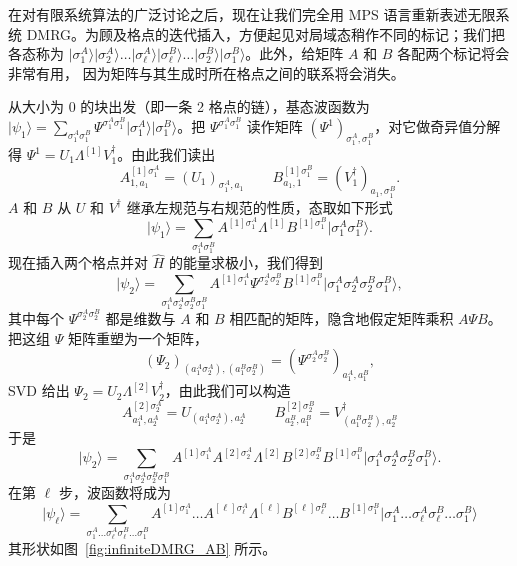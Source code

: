 \documentclass[a4paper,10pt,oneside,onecolumn,1p,times]{elsarticle}
\newcommand{\ket}[1]{\mbox{$| #1  \rangle$}}
\begin{document}
在对有限系统算法的广泛讨论之后，现在让我们完全用 MPS 语言重新表述无限系统 DMRG。为顾及格点的迭代插入，方便起见对局域态稍作不同的标记；我们把各态称为 $\ket{\sigma_1^A} \ket{\sigma_2^A} \ldots \ket{\sigma_\ell^A}\ket{\sigma_\ell^B} \ldots \ket{\sigma_2^B}\ket{\sigma_1^B}$。此外，给矩阵 $A$ 和 $B$ 各配两个标记将会非常有用，
因为矩阵与其生成时所在格点之间的联系将会消失。

从大小为 0 的块出发（即一条 2 格点的链），基态波函数为 $\ket{\psi_1}=\sum_{\sigma_1^A \sigma_1^B} \Psi^{\sigma_1^A \sigma_1^B} \ket{\sigma_1^A} \ket{\sigma_1^B}$。把 $\Psi^{\sigma_1^A\sigma_1^B}$ 读作矩阵 $(\Psi^1)_{\sigma_1^A,\sigma_1^B}$，对它做奇异值分解得  $\Psi^1=U_1 \Lambda^{[1]} V^\dagger_1$。由此我们读出
\begin{equation}
A^{[1]\sigma_1^A}_{1,a_1} = (U_1)_{\sigma_1^A,a_1} \quad\quad B^{[1]\sigma_1^B}_{a_1,1} = (V^\dagger_1)_{a_1,\sigma_1^B} .
\end{equation} 
$A$ 和 $B$ 从 $U$ 和 $V^\dagger$ 继承左规范与右规范的性质，态取如下形式
\begin{equation}
\ket{\psi_1} = \sum_{\sigma_1^A \sigma_1^B} A^{[1]\sigma_1^A} \Lambda^{[1]} B^{[1]\sigma_1^B} \ket{\sigma_1^A \sigma_1^B} .
\end{equation}
现在插入两个格点并对 $\hat{H}$ 的能量求极小，我们得到
\begin{equation}
\ket{\psi_2} = \sum_{\sigma_1^A \sigma_2^A \sigma_2^B \sigma_1^B} A^{[1]\sigma_1^A} 
\Psi^{\sigma_2^A \sigma_2^B} 
B^{[1]\sigma_1^B} \ket{\sigma_1^A \sigma_2^A \sigma_2^B \sigma_1^B},
\end{equation}
其中每个 $\Psi^{\sigma_2^A \sigma_2^B}$ 都是维数与 $A$ 和 $B$ 相匹配的矩阵，隐含地假定矩阵乘积 $A\Psi B$。把这组 $\Psi$ 矩阵重塑为一个矩阵，
\begin{equation}
(\Psi_2)_{(a_1^A \sigma_2^A),(a_1^B \sigma_2^B)} =  (\Psi^{\sigma_2^A \sigma_2^B})_{a_1^A,a_1^B},
\end{equation}
SVD 给出 $\Psi_2 = U_2 \Lambda^{[2]} V^\dagger_2$，由此我们可以构造
\begin{equation}
A^{[2]\sigma_2^A}_{a_1^A,a_2^A} = U_{(a_1^A \sigma_2^A), a_2^A} \quad\quad  
B^{[2]\sigma_2^B}_{a_2^B,a_1^B} = V^\dagger_{(a_1^B \sigma_2^B), a_2^B}
\end{equation}
于是
\begin{equation}
\ket{\psi_2} = \sum_{\sigma_1^A \sigma_2^A \sigma_2^B \sigma_1^B} 
A^{[1]\sigma_1^A}A^{[2]\sigma_2^A} \Lambda^{[2]} B^{[2]\sigma_2^B}B^{[1]\sigma_1^B} 
\ket{\sigma_1^A \sigma_2^A \sigma_2^B \sigma_1^B}.
\end{equation}
在第 $\ell$ 步，波函数将成为
\begin{equation}
\ket{\psi_\ell} = \sum_{\sigma_1^A \ldots \sigma_\ell^A \sigma_\ell^B \ldots \sigma_1^B} 
A^{[1]\sigma_1^A} \ldots A^{[\ell]\sigma_\ell^A} \Lambda^{[\ell]} B^{[\ell]\sigma_\ell^B} \ldots B^{[1]\sigma_1^B}  
\ket{\sigma_1^A \ldots \sigma_\ell^A \sigma_\ell^B \ldots \sigma_1^B}
\end{equation}
其形状如图~\ref{fig:infiniteDMRG_AB} 所示。
\end{document}
